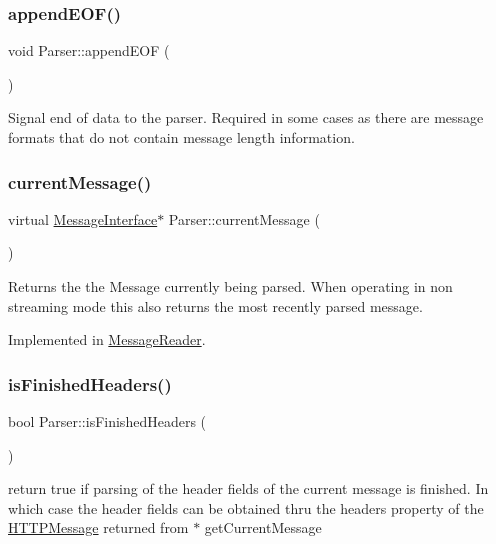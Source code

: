 \subsubsection{\texorpdfstring{append\+E\+O\+F()}{appendEOF()}}
{\footnotesize\ttfamily void Parser\+::append\+E\+OF (\begin{DoxyParamCaption}{ }\end{DoxyParamCaption})}

Signal end of data to the parser. Required in some cases as there are message formats that do not contain message length information. \mbox{\label{class_parser_a7b3c3ac1cf86a5f9fdda1ecf06dcd4dc}} 
\subsubsection{\texorpdfstring{current\+Message()}{currentMessage()}}
{\footnotesize\ttfamily virtual \hyperlink{class_message_interface}{Message\+Interface}$\ast$ Parser\+::current\+Message (\begin{DoxyParamCaption}{ }\end{DoxyParamCaption})\hspace{0.3cm}{\ttfamily [pure virtual]}}

Returns the the Message currently being parsed. When operating in non streaming mode this also returns the most recently parsed message. 

Implemented in \hyperlink{class_message_reader_a06ec9e561ff5cde8f4e1ffb0ff17cb1f}{Message\+Reader}.

\mbox{\label{class_parser_aae7788cc722b8455e691a14dded5d726}} 
\subsubsection{\texorpdfstring{is\+Finished\+Headers()}{isFinishedHeaders()}}
{\footnotesize\ttfamily bool Parser\+::is\+Finished\+Headers (\begin{DoxyParamCaption}{ }\end{DoxyParamCaption})}

return true if parsing of the header fields of the current message is finished. In which case the header fields can be obtained thru the headers property of the \hyperlink{class_h_t_t_p_message}{H\+T\+T\+P\+Message} returned from $\ast$ get\+Current\+Message \mbox{\label{class_parser_ad9d6c98af922409a78ff65083b1983e3}} 
